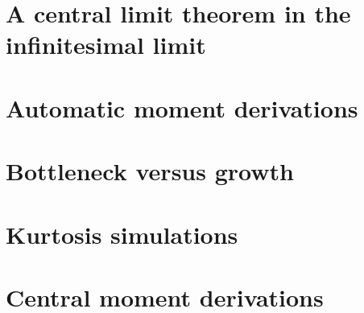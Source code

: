\documentclass{article}
\newcommand{\beginsupplement}{%
        \setcounter{table}{0}
        \renewcommand{\thetable}{S\arabic{table}}%
        \setcounter{figure}{0}
        \renewcommand{\thefigure}{S\arabic{figure}}%
     }
\begin{document}
\appendix
\beginsupplement

\section{A central limit theorem in the infinitesimal limit}
\label{clt}

\section{Automatic moment derivations}
\label{symmath}

\section{Bottleneck versus growth}
\label{bnvsgrowth}

\section{Kurtosis simulations}
\label{kurtsim}

\section{Central moment derivations}
\label{kurt}

\end{document}
